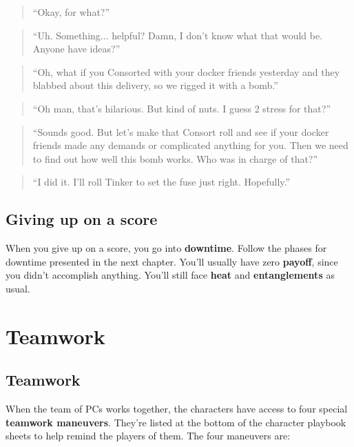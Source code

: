 \documentclass[11pt,oneside]{book}
\newcommand{\gameterm}[1]{\textbf{#1}}
\begin{document}
\begin{quote}
	“Okay, for what?”
\end{quote} 

\begin{quote}
	“Uh. Something... helpful? Damn, I don’t know what that would be. Anyone have ideas?”
\end{quote} 

\begin{quote}
	“Oh, what if you Consorted with your docker friends yesterday and they blabbed about this delivery, so we rigged it with a bomb.”
\end{quote} 

\begin{quote}
	“Oh man, that’s hilarious. But kind of nuts. I guess 2 stress for that?”
\end{quote} 

\begin{quote}
	“Sounds good. But let’s make that Consort roll and see if your docker friends made any demands or complicated anything for you. Then we need to find out how well this bomb works. Who was in charge of that?”
\end{quote} 

\begin{quote}
	“I did it. I’ll roll Tinker to set the fuse just right. Hopefully.”
\end{quote} 

\section{Giving up on a score}

When you give up on a score, you go into \textbf{downtime}. Follow the phases for downtime presented in the next chapter. You’ll usually have zero \textbf{payoff}, since you didn’t accomplish anything. You’ll still face \gameterm{heat}  and \textbf{entanglements} as usual.

\chapter{Teamwork}

\section{Teamwork}

When the team of PCs works together, the characters have access to four special \textbf{teamwork maneuvers}. They’re listed at the bottom of the character playbook sheets to help remind the players of them. The four maneuvers are:
\end{document}
